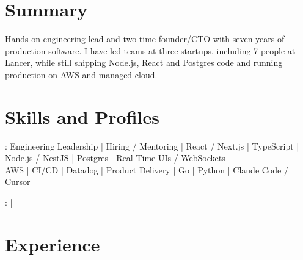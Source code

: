 \documentclass[print]{jack-resume}
\begin{document}
\pagecolor{darkmodeBackground}


\begin{minipage}[t][1cm][t]{.03\textwidth}
    \hfill
\end{minipage}

\section{Summary}
Hands-on engineering lead and two-time founder/CTO with seven years of production software. I have led teams at three startups, including 7 people at Lancer, while still shipping Node.js, React and Postgres code and running production on AWS and managed cloud.
\sectionsep

\section{Skills and Profiles}
:
Engineering Leadership \hfill | \hfill
Hiring / Mentoring \hfill | \hfill
React / Next.js \hfill | \hfill
TypeScript \hfill | \hfill
Node.js / NestJS \hfill | \hfill
Postgres \hfill | \hfill
Real-Time UIs / WebSockets \\
\hspace{1.0cm} AWS \hfill | \hfill
CI/CD \hfill | \hfill
Datadog \hfill | \hfill
Product Delivery \hfill | \hfill
Go \hfill | \hfill
Python \hfill | \hfill
Claude Code / Cursor \\

\raggedright{
    :
      \href{https://www.linkedin.com/in/jack-sturtevant/}{ \ExternalLink} |
     \href{https://github.com/jacksturt}{ \ExternalLink}}

\section{Experience}
\end{document}
